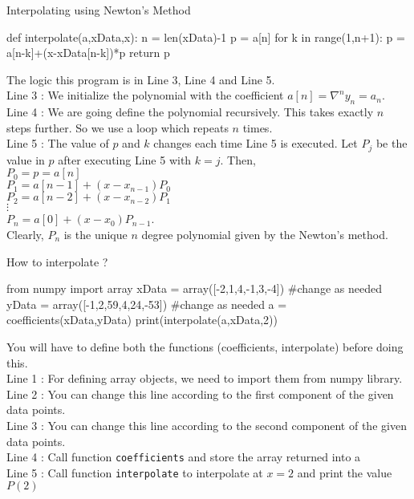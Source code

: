 \begin{program}Interpolating using Newton's Method
	\begin{python}
		def interpolate(a,xData,x):
			n = len(xData)-1
			p = a[n]
			for k in range(1,n+1):
				p = a[n-k]+(x-xData[n-k])*p
			return p
	\end{python}
	The logic this program is in Line 3, Line 4 and Line 5.\\

	Line 3 : We initialize the polynomial with the coefficient $a[n] = \nabla^n y_n = a_n$.\\

	Line 4 : We are going define the polynomial recursively. This takes exactly $n$ steps further. So we use a loop which repeats $n$ times.\\

	Line 5 : The value of $p$ and $k$ changes each time Line 5 is executed. Let $P_j$ be the value in $p$ after executing Line 5 with $k=j$. Then,\\ $P_0 = p = a[n]$\\ $P_1 = a[n-1]+(x-x_{n-1})P_0$\\ $P_2 = a[n-2]+(x-x_{n-2})P_1$\\ $\vdots$\\ $P_n = a[0]+(x-x_0)P_{n-1}$.\\ Clearly, $P_n$ is the unique $n$ degree polynomial given by the Newton's method.
\end{program}

\begin{program}How to interpolate ?
	\begin{python}
		from numpy import array
		xData = array([-2,1,4,-1,3,-4]) #change as needed
		yData = array([-1,2,59,4,24,-53]) #change as needed
		a = coefficients(xData,yData)
		print(interpolate(a,xData,2))
	\end{python}

	You will have to define both the functions (coefficients, interpolate) before doing this.\\

	Line 1 : For defining array objects, we need to import them from numpy library.\\

	Line 2 : You can change this line according to the first component of the given data points.\\

	Line 3 : You can change this line according to the second component of the given data points.\\

	Line 4 : Call function \texttt{coefficients} and store the array returned into a\\

	Line 5 : Call function \texttt{interpolate} to interpolate at $x = 2$ and print the value $P(2)$
\end{program}

